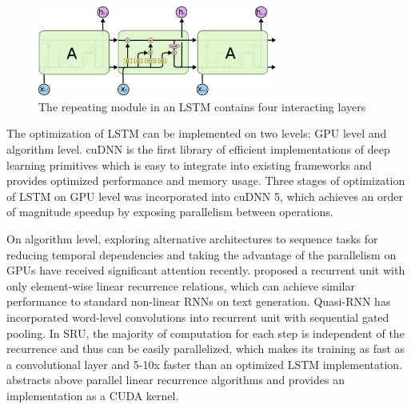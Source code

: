 \documentclass{article}
\begin{document}
\begin{figure}[h]
\centering
\includegraphics[width=0.7\textwidth]{lstm}
\caption{The repeating module in an LSTM contains four interacting layers\cite{understandLSTM}}
\end{figure}


The optimization of LSTM can be implemented on two levels: GPU level and algorithm level. cuDNN\cite{chetlur2014cudnn} is the first library of efficient implementations of deep learning primitives which is easy to integrate into existing frameworks and provides optimized performance and memory usage. Three stages of optimization of LSTM on GPU level was incorporated into cuDNN 5, which achieves an order of magnitude speedup by exposing parallelism between operations.

On algorithm level, exploring alternative architectures to sequence tasks for reducing temporal dependencies and taking the advantage of the parallelism on GPUs have received significant attention recently\cite{chang2017dilated, kaiser2016can, kaiser2015neural, gehring2016convolutional, gehring2017convolutional, kalchbrenner2016neural}. 
\cite{Balduzzi:2016:SRN:3045390.3045527} proposed a recurrent unit with only element-wise linear recurrence relations, which can achieve similar performance to standard non-linear RNNs on text generation.
\cite{bradbury2016quasi} Quasi-RNN has incorporated word-level convolutions into recurrent unit with sequential gated pooling. 
In SRU\cite{lei2017training}, the majority of computation for each step is independent of the recurrence and thus can be easily parallelized, which makes its training as fast as a convolutional layer and 5-10x faster than an optimized LSTM implementation. 
\cite{martin2017parallelizing}abstracts above parallel linear recurrence algorithms and provides an implementation as a CUDA kernel.
\end{document}
